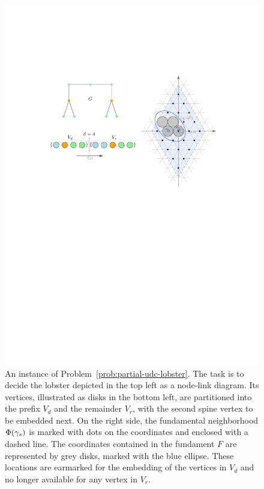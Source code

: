 \begin{figure}
    \centering
    \includegraphics{graphics/ch4_partialproblem.pdf}
    \caption[Partial problem instance]{An instance of Problem~\ref{prob:partial-udc-lobster}. The task is to decide the lobster depicted in the top left as a node-link diagram. Its vertices, illustrated as disks in the bottom left, are partitioned into the prefix $V_d$ and the remainder $V_r$, with the second spine vertex to be embedded next.
    On the right side, the fundamental neighborhood $\Phi(\gamma_s)$ is marked with dots on the coordinates and enclosed with a dashed line. The coordinates contained in the fundament $F$ are represented by grey disks, marked with the blue ellipse. These locations are earmarked for the embedding of the vertices in $V_d$ and no longer available for any vertex in $V_r$.}
    \label{fig:ch4_partialproblem}
\end{figure}

